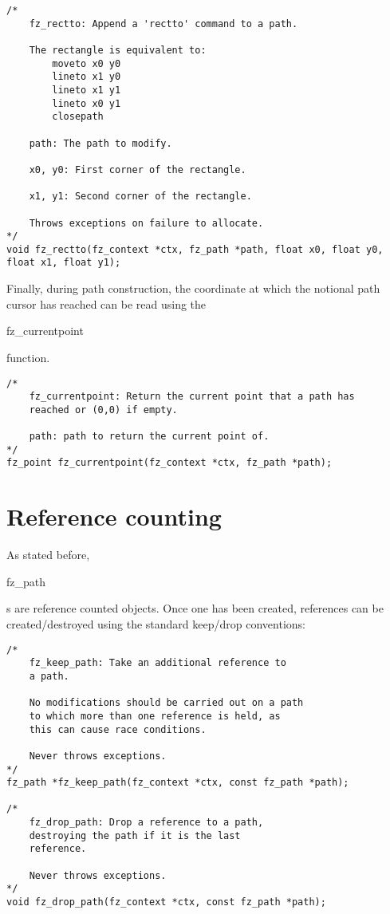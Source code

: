 \documentclass[oneside]{book}
\begin{document}
\begin{lstlisting}
/*
	fz_rectto: Append a 'rectto' command to a path.

	The rectangle is equivalent to:
		moveto x0 y0
		lineto x1 y0
		lineto x1 y1
		lineto x0 y1
		closepath

	path: The path to modify.

	x0, y0: First corner of the rectangle.

	x1, y1: Second corner of the rectangle.

	Throws exceptions on failure to allocate.
*/
void fz_rectto(fz_context *ctx, fz_path *path, float x0, float y0, float x1, float y1);
\end{lstlisting}

Finally, during path construction, the coordinate at which the notional path cursor has reached can be read using the \begin{tt}fz\_currentpoint\end{tt} function.

\begin{lstlisting}
/*
	fz_currentpoint: Return the current point that a path has
	reached or (0,0) if empty.

	path: path to return the current point of.
*/
fz_point fz_currentpoint(fz_context *ctx, fz_path *path);
\end{lstlisting}

\section{Reference counting}

As stated before, \begin{tt}fz\_path\end{tt}s are reference counted objects. Once one has been created, references can be created/destroyed  using the standard keep/drop conventions:

\begin{lstlisting}
/*
	fz_keep_path: Take an additional reference to
	a path.

	No modifications should be carried out on a path
	to which more than one reference is held, as
	this can cause race conditions.

	Never throws exceptions.
*/
fz_path *fz_keep_path(fz_context *ctx, const fz_path *path);

/*
	fz_drop_path: Drop a reference to a path,
	destroying the path if it is the last
	reference.

	Never throws exceptions.
*/
void fz_drop_path(fz_context *ctx, const fz_path *path);
\end{lstlisting}
\end{document}
